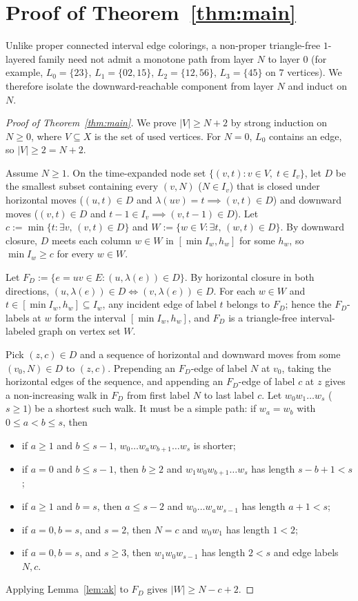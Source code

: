 \documentclass[11pt]{article}
\begin{document}
\section{Proof of Theorem~\ref{thm:main}}

Unlike proper connected interval edge colorings, a non-proper triangle-free $1$-layered family need not admit a monotone path from layer $N$ to layer $0$ (for example, $L_0 = \{23\}$, $L_1 = \{02, 15\}$, $L_2 = \{12, 56\}$, $L_3 = \{45\}$ on $7$ vertices). We therefore isolate the downward-reachable component from layer $N$ and induct on $N$.

\begin{proof}[Proof of Theorem~\ref{thm:main}]
We prove $|V| \ge N + 2$ by strong induction on $N \ge 0$, where $V \subseteq X$ is the set of used vertices. For $N = 0$, $L_0$ contains an edge, so $|V| \ge 2 = N + 2$.

Assume $N \ge 1$. On the time-expanded node set $\{(v, t) : v \in V,\; t \in I_v\}$, let $D$ be the smallest subset containing every $(v, N)$ ($N \in I_v$) that is closed under horizontal moves ($(u, t) \in D$ and $\lambda(uv) = t \implies (v, t) \in D$) and downward moves ($(v, t) \in D$ and $t - 1 \in I_v \implies (v, t - 1) \in D$). Let $c := \min\{t : \exists v,\, (v, t) \in D\}$ and $W := \{w \in V : \exists t,\, (w, t) \in D\}$. By downward closure, $D$ meets each column $w \in W$ in $[\min I_w, h_w]$ for some $h_w$, so $\min I_w \ge c$ for every $w \in W$.

Let $F_D := \{e = uv \in E : (u, \lambda(e)) \in D\}$. By horizontal closure in both directions, $(u, \lambda(e)) \in D \iff (v, \lambda(e)) \in D$. For each $w \in W$ and $t \in [\min I_w, h_w] \subseteq I_w$, any incident edge of label $t$ belongs to $F_D$; hence the $F_D$-labels at $w$ form the interval $[\min I_w, h_w]$, and $F_D$ is a triangle-free interval-labeled graph on vertex set $W$.

Pick $(z, c) \in D$ and a sequence of horizontal and downward moves from some $(v_0, N) \in D$ to $(z, c)$. Prepending an $F_D$-edge of label $N$ at $v_0$, taking the horizontal edges of the sequence, and appending an $F_D$-edge of label $c$ at $z$ gives a non-increasing walk in $F_D$ from first label $N$ to last label $c$. Let $w_0 w_1 \dots w_s$ ($s \ge 1$) be a shortest such walk. It must be a simple path: if $w_a = w_b$ with $0 \le a < b \le s$, then
\begin{itemize}
\item if $a \ge 1$ and $b \le s - 1$, $w_0 \dots w_a w_{b+1} \dots w_s$ is shorter;
\item if $a = 0$ and $b \le s - 1$, then $b \ge 2$ and $w_1 w_0 w_{b+1} \dots w_s$ has length $s - b + 1 < s$;
\item if $a \ge 1$ and $b = s$, then $a \le s - 2$ and $w_0 \dots w_a w_{s-1}$ has length $a + 1 < s$;
\item if $a = 0, b = s$, and $s = 2$, then $N = c$ and $w_0 w_1$ has length $1 < 2$;
\item if $a = 0, b = s$, and $s \ge 3$, then $w_1 w_0 w_{s-1}$ has length $2 < s$ and edge labels $N, c$.
\end{itemize}
Applying Lemma~\ref{lem:ak} to $F_D$ gives $|W| \ge N - c + 2$.


\end{proof}
\end{document}
